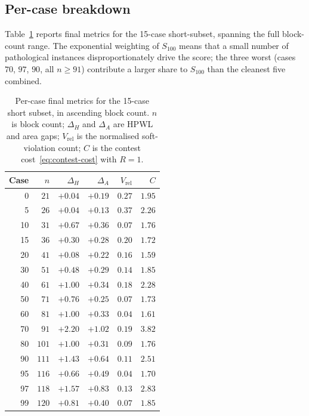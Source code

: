 \documentclass[nolineno]{ieeeaccess}
\begin{document}
\subsection{Per-case breakdown}
\label{sec:exp-percase}

Table~\ref{tab:case-breakdown} reports final metrics for the 15-case
short-subset, spanning the full block-count range. The exponential
weighting of $S_{100}$ means that a small number of pathological
instances disproportionately drive the score; the three worst
(cases~$70$, $97$, $90$, all $n\ge 91$) contribute a
larger share to $S_{100}$ than the cleanest five combined.

\begin{table}[t]
\caption{Per-case final metrics for the 15-case short subset, in
ascending block count. $n$ is block count; $\Delta_H$ and $\Delta_A$
are HPWL and area gaps; $V_{\text{rel}}$ is the normalised
soft-violation count; $C$ is the contest cost~\eqref{eq:contest-cost}
with $R{=}1$.}
\label{tab:case-breakdown}
\centering
\footnotesize
\begin{tabular}{@{}rrrrrr@{}}
\toprule
Case & $n$ & $\Delta_H$ & $\Delta_A$ & $V_{\text{rel}}$ & $C$\\
\midrule
0     & $21$   & $+0.04$ & $+0.19$ & $0.27$ & $1.95$\\
5     & $26$   & $+0.04$ & $+0.13$ & $0.37$ & $2.26$\\
10    & $31$   & $+0.67$ & $+0.36$ & $0.07$ & $1.76$\\
15    & $36$   & $+0.30$ & $+0.28$ & $0.20$ & $1.72$\\
20    & $41$   & $+0.08$ & $+0.22$ & $0.16$ & $1.59$\\
30    & $51$   & $+0.48$ & $+0.29$ & $0.14$ & $1.85$\\
40    & $61$   & $+1.00$ & $+0.34$ & $0.18$ & $2.28$\\
50    & $71$   & $+0.76$ & $+0.25$ & $0.07$ & $1.73$\\
60    & $81$   & $+1.00$ & $+0.33$ & $0.04$ & $1.61$\\
70    & $91$   & $+2.20$ & $+1.02$ & $0.19$ & $3.82$\\
80    & $101$  & $+1.00$ & $+0.31$ & $0.09$ & $1.76$\\
90    & $111$  & $+1.43$ & $+0.64$ & $0.11$ & $2.51$\\
95    & $116$  & $+0.66$ & $+0.49$ & $0.04$ & $1.70$\\
97    & $118$  & $+1.57$ & $+0.83$ & $0.13$ & $2.83$\\
99    & $120$  & $+0.81$ & $+0.40$ & $0.07$ & $1.85$\\
\bottomrule
\end{tabular}
\end{table}
\end{document}

